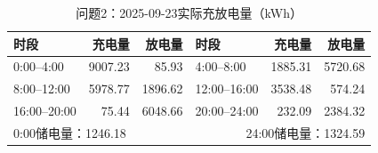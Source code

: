 \begin{table}[H]\centering\small
\caption{问题2：2025-09-23实际充放电量（kWh）}
\label{tab:q2_0923_storage}
\begin{tabular}{lrrlrr}\toprule
时段 & 充电量 & 放电量 & 时段 & 充电量 & 放电量\\\midrule
0:00--4:00 & 9007.23 & 85.93 & 4:00--8:00 & 1885.31 & 5720.68 \\
8:00--12:00 & 5978.77 & 1896.62 & 12:00--16:00 & 3538.48 & 574.24 \\
16:00--20:00 & 75.44 & 6048.66 & 20:00--24:00 & 232.09 & 2384.32 \\
\midrule\multicolumn{3}{l}{0:00储电量：1246.18} & \multicolumn{3}{r}{24:00储电量：1324.59}\\
\bottomrule\end{tabular}\end{table}

